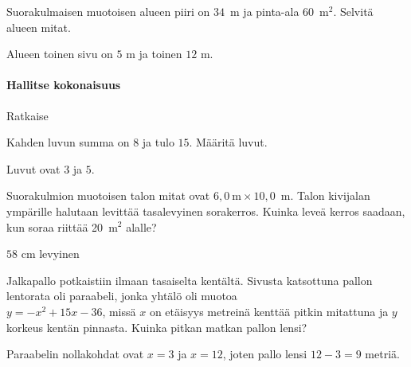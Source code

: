 \begin{tehtavasivu}
\begin{tehtava}
    Suorakulmaisen muotoisen alueen piiri on $34$~m ja pinta-ala $60$~m$^2$. Selvitä alueen mitat.
    \begin{vastaus}
		Alueen toinen sivu on $5$ m ja toinen $12$ m.
    \end{vastaus}
\end{tehtava}

\paragraph*{Hallitse kokonaisuus}

\begin{tehtava}
    Ratkaise
    \begin{alakohdat}
    \end{alakohdat}
    \begin{vastaus}
        \begin{alakohdat}
        \end{alakohdat}
    \end{vastaus}
\end{tehtava}

\begin{tehtava}
    Kahden luvun summa on $8$ ja tulo $15$. Määritä luvut.
    \begin{vastaus}
		Luvut ovat $3$ ja $5$.
    \end{vastaus}
\end{tehtava}

\begin{tehtava}
    Suorakulmion muotoisen talon mitat ovat $6,0~\text{m} \times 10,0$~m.
	Talon kivijalan ympärille halutaan levittää tasalevyinen sorakerros. Kuinka 
    leveä kerros saadaan, kun soraa riittää 20~$\text{m}^2$ alalle?
    \begin{vastaus}
		$58$ cm levyinen
    \end{vastaus}
\end{tehtava}

\begin{tehtava}
	Jalkapallo potkaistiin ilmaan tasaiselta kentältä. Sivusta katsottuna pallon lentorata oli paraabeli, jonka
	yhtälö oli muotoa \\$y=-x^2+15x-36$, missä $x$ on etäisyys metreinä kenttää pitkin mitattuna ja $y$ korkeus kentän pinnasta.
Kuinka pitkan matkan pallon lensi?
	\begin{vastaus}
		Paraabelin nollakohdat ovat $x=3$ ja $x=12$, joten pallo lensi
		$12-3 = 9$ metriä. 
	\end{vastaus}
\end{tehtava}


\end{tehtavasivu}
